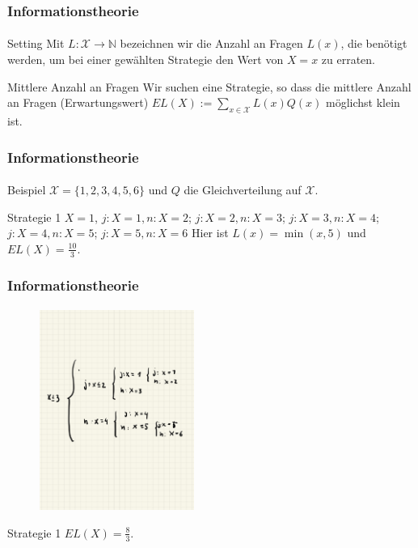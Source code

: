 \documentclass{beamer}
\begin{document}
\begin{frame}
    \frametitle{Informationstheorie}
\framesubtitle{}
\begin{block}{Setting}
Mit $L : \mathcal{X} \to \mathbb{N}$ bezeichnen wir die Anzahl an Fragen $L(x)$, die benötigt werden, um bei einer gewählten Strategie den Wert von $X = x$ zu erraten.
\end{block}

\begin{block}{Mittlere Anzahl an Fragen}
Wir suchen eine Strategie, so dass die mittlere Anzahl an Fragen  (Erwartungswert) $EL(X) := \sum_{x \in \mathcal{X}} L(x) Q(x)$  möglichst klein ist.
\end{block}

 \end{frame}


\begin{frame}
    \frametitle{Informationstheorie}
\framesubtitle{}

\begin{block}{Beispiel}
 $\mathcal{X} = \{ 1,2,3,4,5,6 \}$ und $Q$ die Gleichverteilung auf $\mathcal{X}$.
\end{block}

\begin{block}{Strategie 1}
$X = 1$, $j: X = 1, n: X = 2$; $j: X = 2, n:X= 3$; $j:X = 3, n:X= 4$; $j:X = 4, n:X= 5$; $j:X = 5, n:X= 6$ 
Hier ist $L(x) = \min(x,5)$ und $EL(X) = \frac{10}{3}$.
\end{block}

 \end{frame}

\begin{frame}
    \frametitle{Informationstheorie}
\framesubtitle{}
\begin{figure}[htp]
      \centering
    \includegraphics[width=0.45\textwidth]{img/strategie2}
\end{figure}

\begin{block}{Strategie 1}
 $EL(X) = \frac{8}{3}$.
\end{block}

 \end{frame}
\end{document}
